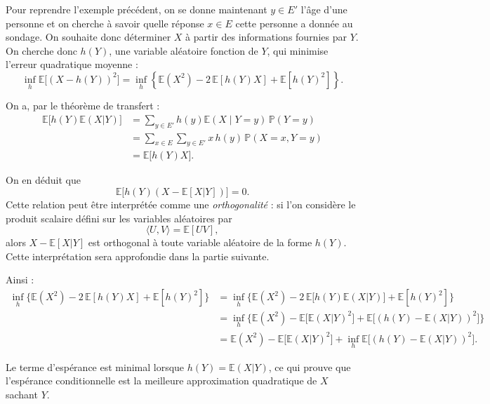 \begin{proposition}
    Pour reprendre l'exemple précédent, on se donne maintenant $y \in E'$ l'âge d'une personne et 
    on cherche à savoir quelle réponse $x \in E$ cette personne a donnée au sondage. 
    On souhaite donc déterminer $X$ à partir des informations fournies par $Y$. 
    On cherche donc $h(Y)$, une variable aléatoire fonction de $Y$, qui minimise l'erreur quadratique moyenne :
    \[
        \inf_h \mathbb{E}\big[(X - h(Y))^2\big] 
        = \inf_h \left\{ \mathbb{E}(X^2) - 2\,\mathbb{E}[h(Y)X] + \mathbb{E}[h(Y)^2] \right\}.
    \]

    On a, par le théorème de transfert :
    \begin{align*}
        \mathbb{E}\big[h(Y)\mathbb{E}(X|Y)\big] 
        &= \sum_{y \in E'} h(y) \mathbb{E}(X \mid Y = y)\, \mathbb{P}(Y = y) \\ 
        &= \sum_{x \in E}\sum_{y \in E'} x\,h(y)\,\mathbb{P}(X = x, Y = y) \\ 
        &= \mathbb{E}\big[h(Y)X\big].
    \end{align*}

    On en déduit que 
    \[
        \mathbb{E}\big[h(Y)(X - \mathbb{E}[X|Y])\big] = 0.
    \]
    Cette relation peut être interprétée comme une \emph{orthogonalité} : 
    si l’on considère le produit scalaire défini sur les variables aléatoires par 
    \[
        \langle U, V \rangle = \mathbb{E}[UV],
    \]
    alors $X - \mathbb{E}[X|Y]$ est orthogonal à toute variable aléatoire de la forme $h(Y)$. 
    Cette interprétation sera approfondie dans la partie suivante.

    Ainsi :
    \begin{align*}
        \inf_h \Big\{ \mathbb{E}(X^2) - 2\,\mathbb{E}[h(Y)X] + \mathbb{E}[h(Y)^2] \Big\}
        &= \inf_h \Big\{ \mathbb{E}(X^2) - 2\,\mathbb{E}\big[h(Y)\mathbb{E}(X|Y)\big] + \mathbb{E}[h(Y)^2] \Big\} \\
        &= \inf_h \Big\{ \mathbb{E}(X^2) - \mathbb{E}\big[\mathbb{E}(X|Y)^2\big] 
           + \mathbb{E}\big[(h(Y) - \mathbb{E}(X|Y))^2\big] \Big\} \\
        &= \mathbb{E}(X^2) - \mathbb{E}\big[\mathbb{E}(X|Y)^2\big]
           + \inf_h \mathbb{E}\big[(h(Y) - \mathbb{E}(X|Y))^2\big].
    \end{align*}

    Le terme d'espérance est minimal lorsque $h(Y) = \mathbb{E}(X|Y)$, 
    ce qui prouve que l'espérance conditionnelle est la meilleure approximation quadratique de $X$ sachant $Y$.
\end{proposition}


